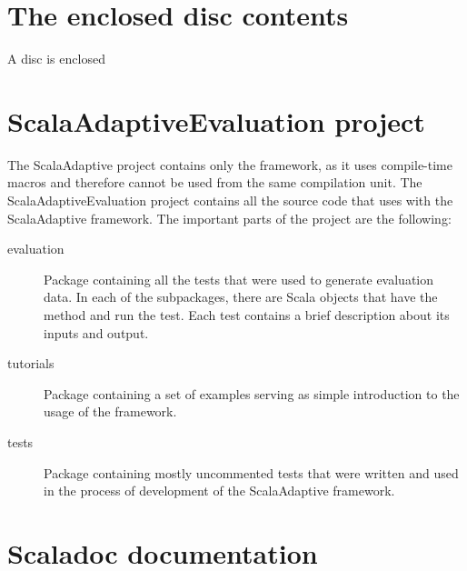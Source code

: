 \documentclass[12pt,a4paper]{report}
\begin{document}
\label{attachments}
\renewcommand{\thesection}{\Alph{section}}

\section{The enclosed disc contents}
\label{attach:cd}

A disc is enclosed 

\section{ScalaAdaptiveEvaluation project}
\label{attach:eval_project}

The ScalaAdaptive project contains only the framework, as it uses compile-time macros and therefore cannot be used from the same compilation unit. The ScalaAdaptiveEvaluation project contains all the source code that uses with the ScalaAdaptive framework. The important parts of the project are the following:

\begin{description}
	\item [evaluation] Package containing all the tests that were used to generate evaluation data. In each of the subpackages, there are Scala objects that have the  method and run the test. Each test contains a brief description about its inputs and output.
	\item [tutorials] Package containing a set of examples serving as simple introduction to the usage of the framework.
	\item [tests] Package containing mostly uncommented tests that were written and used in the process of development of the ScalaAdaptive framework.
\end{description}

\section{Scaladoc documentation}
\label{attach:scaladoc}
\end{document}
